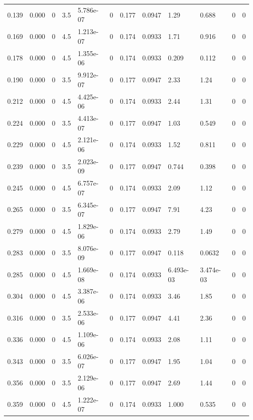 \documentclass[preview]{standalone}
\begin{document}
{{\begin{tabular}{L{1.2cm}C{1.2cm} C{0.3cm}C{0.5cm} C{1.4cm}C{1.4cm} C{1.4cm}C{1.4cm} C{1.6cm}C{1.6cm} C{1.6cm}C{1.6cm}}
  0.139  &  0.000  & 0     & 3.5 &  5.786e-07  & 0  &  0.177&   0.0947& 1.29 & 0.688   &  0 & 0  \\ 
  0.169  &  0.000  & 0     & 4.5 &  1.213e-07  & 0  &  0.174&   0.0933& 1.71 & 0.916   &  0 & 0  \\ 
  0.178  &  0.000  & 0     & 4.5 &  1.355e-06  & 0  &  0.174&   0.0933& 0.209 & 0.112   &  0 & 0  \\ 
  0.190  &  0.000  & 0     & 3.5 &  9.912e-07  & 0  &  0.177&   0.0947& 2.33 & 1.24   &  0 & 0  \\ 
  0.212  &  0.000  & 0     & 4.5 &  4.425e-06  & 0  &  0.174&   0.0933& 2.44 & 1.31   &  0 & 0  \\ 
  0.224  &  0.000  & 0     & 3.5 &  4.413e-07  & 0  &  0.177&   0.0947& 1.03 & 0.549   &  0 & 0  \\ 
  0.229  &  0.000  & 0     & 4.5 &  2.121e-06  & 0  &  0.174&   0.0933& 1.52 & 0.811   &  0 & 0  \\ 
  0.239  &  0.000  & 0     & 3.5 &  2.023e-09  & 0  &  0.177&   0.0947& 0.744 & 0.398   &  0 & 0  \\ 
  0.245  &  0.000  & 0     & 4.5 &  6.757e-07  & 0  &  0.174&   0.0933& 2.09 & 1.12   &  0 & 0  \\ 
  0.265  &  0.000  & 0     & 3.5 &  6.345e-07  & 0  &  0.177&   0.0947& 7.91 & 4.23   &  0 & 0  \\ 
  0.279  &  0.000  & 0     & 4.5 &  1.829e-06  & 0  &  0.174&   0.0933& 2.79 & 1.49   &  0 & 0  \\ 
  0.283  &  0.000  & 0     & 3.5 &  8.076e-09  & 0  &  0.177&   0.0947& 0.118 & 0.0632   &  0 & 0  \\ 
  0.285  &  0.000  & 0     & 4.5 &  1.669e-08  & 0  &  0.174&   0.0933& 6.493e-03 & 3.474e-03   &  0 & 0  \\ 
  0.304  &  0.000  & 0     & 4.5 &  3.387e-06  & 0  &  0.174&   0.0933& 3.46 & 1.85   &  0 & 0  \\ 
  0.316  &  0.000  & 0     & 3.5 &  2.533e-06  & 0  &  0.177&   0.0947& 4.41 & 2.36   &  0 & 0  \\ 
  0.336  &  0.000  & 0     & 4.5 &  1.109e-06  & 0  &  0.174&   0.0933& 2.08 & 1.11   &  0 & 0  \\ 
  0.343  &  0.000  & 0     & 3.5 &  6.026e-07  & 0  &  0.177&   0.0947& 1.95 & 1.04   &  0 & 0  \\ 
  0.356  &  0.000  & 0     & 3.5 &  2.129e-06  & 0  &  0.177&   0.0947& 2.69 & 1.44   &  0 & 0  \\ 
  0.359  &  0.000  & 0     & 4.5 &  1.222e-07  & 0  &  0.174&   0.0933& 1.000 & 0.535   &  0 & 0  \\ 

\end{tabular}}}
\end{document}
